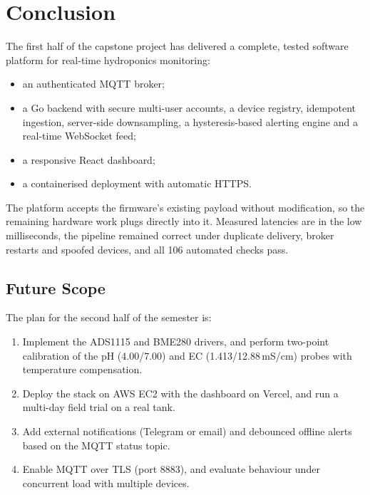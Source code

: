 \documentclass[11pt,a4paper,oneside]{report}
\begin{document}
\chapter{Conclusion}
The first half of the capstone project has delivered a complete, tested software
platform for real-time hydroponics monitoring:
\begin{itemize}
  \item an authenticated MQTT broker;
  \item a Go backend with secure multi-user accounts, a device registry, idempotent
        ingestion, server-side downsampling, a hysteresis-based alerting engine and a
        real-time WebSocket feed;
  \item a responsive React dashboard;
  \item a containerised deployment with automatic HTTPS.
\end{itemize}
The platform accepts the firmware's existing payload without modification, so the
remaining hardware work plugs directly into it. Measured latencies are in the low
milliseconds, the pipeline remained correct under duplicate delivery, broker restarts
and spoofed devices, and all 106 automated checks pass.

\section{Future Scope}
The plan for the second half of the semester is:
\begin{enumerate}
  \item Implement the ADS1115 and BME280 drivers, and perform two-point calibration of
        the pH (4.00/7.00) and EC (1.413/12.88\,mS/cm) probes with temperature
        compensation.
  \item Deploy the stack on AWS EC2 with the dashboard on Vercel, and run a multi-day
        field trial on a real tank.
  \item Add external notifications (Telegram or email) and debounced offline alerts
        based on the MQTT status topic.
  \item Enable MQTT over TLS (port 8883), and evaluate behaviour under concurrent load
        with multiple devices.
\end{enumerate}
\end{document}
